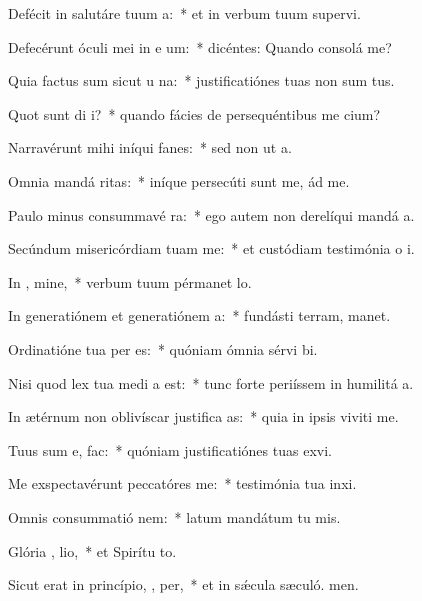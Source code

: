 \item Defécit in salutáre tuum  a:~* et in verbum tuum supervi.
\item Defecérunt óculi mei in e um:~* dicéntes: Quando consolá me?
\item Quia factus sum sicut u  na:~* justificatiónes tuas non sum tus.
\item Quot sunt di  i?~* quando fácies de persequéntibus me cium?
\item Narravérunt mihi iníqui fanes:~* sed non ut  a.
\item Omnia mandá  ritas:~* iníque persecúti sunt me, ád me.
\item Paulo minus consummavé   ra:~* ego autem non derelíqui mandá a.
\item Secúndum misericórdiam tuam  me:~* et custódiam testimónia o i.
\item In , mine,~* verbum tuum pérmanet  lo.
\item In generatiónem et generatiónem  a:~* fundásti terram,  manet.
\item Ordinatióne tua per es:~* quóniam ómnia sérvi bi.
\item Nisi quod lex tua medi a est:~* tunc forte periíssem in humilitá a.
\item In ætérnum non oblivíscar justifica as:~* quia in ipsis viviti me.
\item Tuus sum e,   fac:~* quóniam justificatiónes tuas exvi.
\item Me exspectavérunt peccatóres   me:~* testimónia tua inxi.
\item Omnis consummatió  nem:~* latum mandátum tu mis.
\item Glória ,  lio,~* et Spirítu to.
\item Sicut erat in princípio,  ,  per,~* et in sǽcula sæculó. men.
